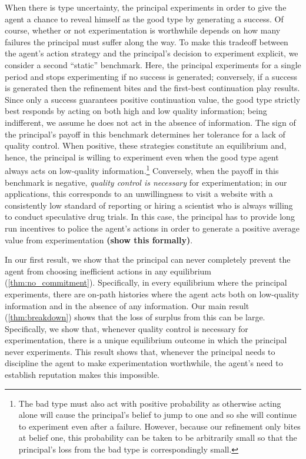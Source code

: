 \documentclass[11pt,reqno]{amsart}
\begin{document}
When there is type uncertainty, the principal experiments in order to give the agent a chance to reveal himself as the good type by generating a success. Of course, whether or not experimentation is worthwhile depends on how many failures the principal must suffer along the way. To make this tradeoff between the agent's action strategy and the principal's decision to experiment explicit, we consider a second ``static'' benchmark. Here, the principal experiments for a single period and stops experimenting if no success is generated; conversely, if a success is generated then the refinement bites and the first-best continuation play results. Since only a success guarantees positive continuation value, the good type strictly best responds by acting on both high and low quality information; being indifferent, we assume he does not act in the absence of information. The sign of the principal's payoff in this benchmark determines her tolerance for a lack of quality control. When positive, these strategies constitute an equilibrium and, hence, the principal is willing to experiment even when the good type agent always acts on low-quality information.\footnote{The bad type must also act with positive probability as otherwise acting alone will cause the principal's belief to jump to one and so she will continue to experiment even after a failure. However, because our refinement only bites at belief one, this probability can be taken to be arbitrarily small so that the principal's loss from the bad type is correspondingly small.} Conversely, when the payoff in this benchmark is negative, \textit{quality control is necessary} for experimentation; in our applications, this corresponds to an unwillingness to visit a website with a consistently low standard of reporting or hiring a scientist who is always willing to conduct speculative drug trials. In this case, the principal has to provide long run incentives to police the agent's actions in order to generate a positive average value from experimentation \textbf{(show this formally)}.

In our first result, we show that the principal can never completely prevent the agent from choosing inefficient actions in any equilibrium (\cref{thm:no_commitment}). Specifically, in every equilibrium where the principal experiments, there are on-path histories where the agent acts both on low-quality information and in the absence of any information. Our main result (\cref{thm:breakdown}) shows that the loss of surplus from this can be large. Specifically, we show that, whenever quality control is necessary for experimentation, there is a unique equilibrium outcome in which the principal never experiments. This result shows that, whenever the principal needs to discipline the agent to make experimentation worthwhile, the agent's need to establish reputation makes this impossible.
\end{document}
